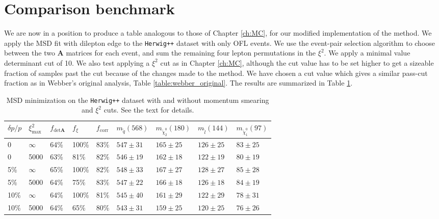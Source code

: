 \documentclass[twoside,english]{uiofysmaster}
\begin{document}
\section{Comparison benchmark}
We are now in a position to produce a table analogous to those of Chapter \ref{ch:MC}, for our modified implementation of the method. We apply the MSD fit with dilepton edge to the {\tt Herwig++} dataset with only OFL events. We use the event-pair selection algorithm to choose between the two $\mathbf{A}$ matrices for each event, and sum the remaining four lepton permutations in the $\xi^2$. We apply a minimal value determinant cut of 10. We also test applying a $\xi^2$ cut as in Chapter \ref{ch:MC}, although the cut value has to be set higher to get a sizeable fraction of samples past the cut because of the changes made to the method. We have chosen a cut value which gives a similar pass-cut fraction as in Webber's original analysis, Table \ref{table:webber_original}. The results are summarized in Table \ref{table:MD_fit_table}.%
\begin{table}[hbt]
	\centering
	\begin{tabular}{| l | l | l | l | l  || l | l | l | l |}
		\hline
		$\delta p/p$ &  $\xi^2_\mathrm{max}$ & $f_{\mathrm{det}\mathbf{A}}$ &  $f_\xi$ & $f_\mathrm{corr}$ & $m_{\tilde q} (568)$ & $m_{\tilde \chi_2^0} (180)$ & $m_{\tilde l} (144)$ & $m_{\tilde \chi_1^0} (97)$ \\
		\hline \hline
		0     & 	$\infty$ & 64\%  &	100\%	& 83\%	& $547 \pm 31$	&	$165 \pm 25$	&	$126 \pm 25$	& 	$83 \pm 25$	\\
		0     &		5000     & 63\%  &		81\%	& 82\%    & $546 \pm 19$	&	$162 \pm 18$	&	$122 \pm 19$	&	$80 \pm 19$	\\
		5\%   &	$\infty$   & 65\%  &	100\%	& 82\%    & $548 \pm 33$	& 	$167 \pm 27$	&	$128 \pm 27$	&	$85 \pm 28$ \\
		5\%   &	5000       & 64\%  &		75\%	& 83\%      & $547 \pm 22$	&	$166 \pm 18$	& 	$126 \pm 18$	&	$84 \pm 19$	\\
		10\%  &	$\infty$   & 64\%  &100\%	& 81\%      & $545 \pm 40$	&	$161 \pm 29$	&	$122 \pm 29$	&	$78 \pm 31$	\\
		10\%  &	5000       & 64\%  &		65\%	& 80\%      & $543 \pm 31$	& 	$159 \pm 25$	&	$120 \pm 25$	&	$76 \pm 26$ \\
		\hline
	\end{tabular}
	\caption{MSD minimization on the {\tt Herwig++} dataset with and without momentum smearing and $\xi^2$ cuts. See the text for details.}
	\label{table:MD_fit_table}
\end{table}
\end{document}
